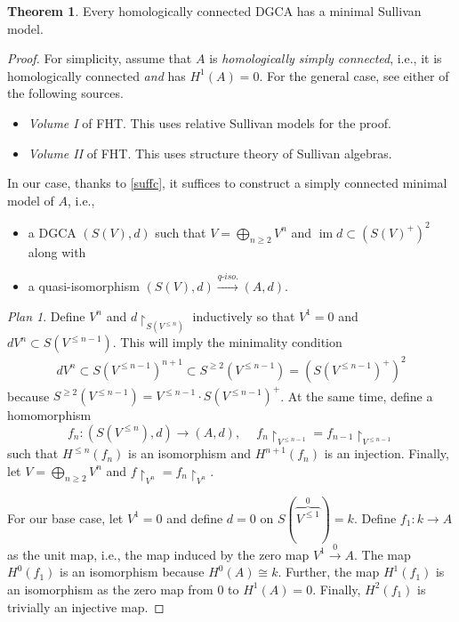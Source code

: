 \documentclass[10pt,letterpaper,cm]{nupset}
\theoremstyle{definition}
\theoremstyle{theorem}
\newtheorem{theorem}[defn]{Theorem}
\theoremstyle{remark}
\newtheorem*{plan}{Plan}
\newcommand{\1}{\mathbb{1}}
\newcommand{\0}{\vec 0}
\DeclareMathOperator{\im}{im}
\newcommand{\bi}{\begin{itemize}}
\newcommand{\ei}{\end{itemize}}
\begin{document}
\begin{theorem}\label{minmod}
Every homologically connected DGCA has a minimal Sullivan model. 
\end{theorem}
\begin{proof}
For simplicity, assume that  $A$ is \textit{homologically simply connected}, i.e., it is homologically connected \emph{and} has $H^1(A) =0$. For the general case, see either of the following sources.
\bi
\item \textit{Volume I} of FHT. This uses relative Sullivan models for the proof.
\item  \textit{Volume II} of FHT. This uses structure theory of Sullivan algebras.
\ei
In our case, thanks to \cref{suffc},  it suffices to construct a simply connected minimal model of $A$, i.e.,
\bi
\item a DGCA  $\left(S(V), d\right)$ such that $V = \bigoplus_{n \geq 2}V^n$ and $\im{d} \subset \left(S(V)^+\right)^2$ along with
\item a quasi-isomorphism $\left(S(V), d\right) \xrightarrow{\textit{q-iso.}} \left(A,d\right)$.
\ei 
\begin{plan}
Define $V^n$ and $d\restriction_{S(V^{\leq n})}$ inductively so that $V^1 =0$ and $d{V^n} \subset S(V^{\leq n-1})$. This will imply the minimality condition 
\begin{align*}
d{V^n} \subset S(V^{\leq n-1})^{n+1} \subset S^{ \geq 2}(V^{\leq n-1}) = \left(S(V^{\leq n-1})^+\right)^2
\end{align*}
because $S^{ \geq 2}(V^{\leq n-1}) = V^{ \leq n-1} \cdot S(V^{\leq n-1})^+$. At the same time, define a homomorphism 
\[
f_n : \left(S(V^{\leq n}), d\right) \to \left(A, d\right), \ \quad f_n\restriction_{V^{\leq n-1}} = f_{n-1}\restriction_{V^{ \leq n-1}}
\] such that $H^{\leq n}(f_n)$ is an isomorphism and $H^{n+1}(f_n)$ is an injection. Finally, let $V = \bigoplus_{n \geq 2}V^n$ and \linebreak $f\restriction_{V^n} = f_n\restriction_{V^n}$.
\end{plan}
For our base case, let $V^1 =0$ and define $d = 0$ on $S(\overbrace{V^{\leq1}}^{0}) = k$. Define $f_1 : k \to A$ as the unit map, i.e., the map induced by  the zero map $V^1 \xrightarrow{0} A$.  The map $H^0(f_1)$ is an isomorphism because $H^0(A) \cong k$. Further, the map $H^1(f_1)$ is an isomorphism as the zero map from $0$ to $H^1(A) =0$. Finally, $H^2(f_1)$ is trivially an injective map.

\medskip


\end{proof}
\end{document}
